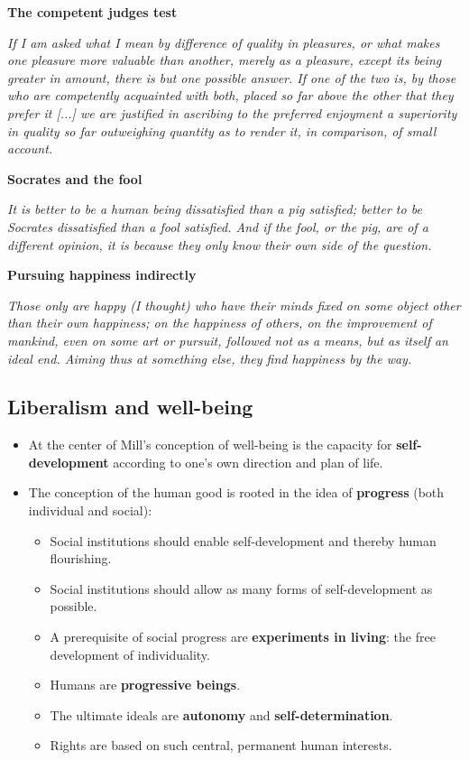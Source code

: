 \textbf{The competent judges test}

\textit{If I am asked what I mean by difference of quality in pleasures, or
what makes one pleasure more valuable than another, merely as a pleasure,
except its being greater in amount, there is but one possible answer. If one
of the two is, by those who are competently acquainted with both, placed so
far above the other that they prefer it [...] we are justified in ascribing
to the preferred enjoyment a superiority in quality so far outweighing
quantity as to render it, in comparison, of small account.}

\textbf{Socrates and the fool}

\textit{It is better to be a human being dissatisfied than a pig satisfied;
better to be Socrates dissatisfied than a fool satisfied. And if the fool, or
the pig, are of a different opinion, it is because they only know their own
side of the question.}

\textbf{Pursuing happiness indirectly}

\textit{Those only are happy (I thought) who have their minds fixed on some
object other than their own happiness; on the happiness of others, on the
improvement of mankind, even on some art or pursuit, followed not as a means,
but as itself an ideal end. Aiming thus at something else, they find
happiness by the way.}

\subsection{Liberalism and well-being}

\begin{itemize}
    \item At the center of Mill's conception of well-being is the capacity
    for \textbf{self-development} according to one's own direction and plan
    of life.
    \item The conception of the human good is rooted in the idea of
    \textbf{progress} (both individual and social):
    \begin{itemize}
        \item Social institutions should enable self-development and thereby
        human flourishing.
        \item Social institutions should allow as many forms of
        self-development as possible.
        \item A prerequisite of social progress are \textbf{experiments in
        living}: the free development of individuality.
        \item Humans are \textbf{progressive beings}.
        \item The ultimate ideals are \textbf{autonomy} and
        \textbf{self-determination}.
        \item Rights are based on such central, permanent human interests.
    \end{itemize}
\end{itemize}

